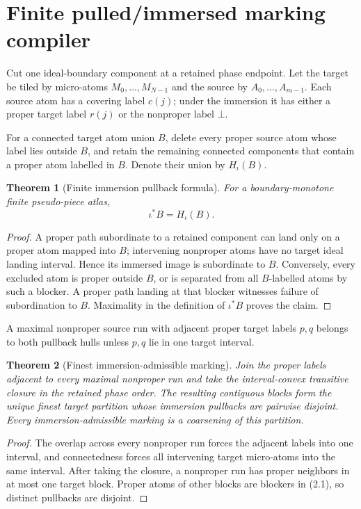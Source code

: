 \documentclass[11pt]{article}
\newtheorem{theorem}{Theorem}[section]
\theoremstyle{definition}
\theoremstyle{remark}
\begin{document}
\section{Finite pulled/immersed marking compiler}
Cut one ideal-boundary component at a retained phase endpoint.  Let the target
be tiled by micro-atoms $M_0,\ldots,M_{N-1}$ and the source by
$A_0,\ldots,A_{m-1}$.  Each source atom has a covering label $c(j)$; under the
immersion it has either a proper target label $r(j)$ or the nonproper label
$\bot$.

For a connected target atom union $B$, delete every proper source atom whose
label lies outside $B$, and retain the remaining connected components that
contain a proper atom labelled in $B$.  Denote their union by $H_\iota(B)$.

\begin{theorem}[Finite immersion pullback formula]
For a boundary-monotone finite pseudo-piece atlas,
\[
 \boxed{\iota^*B=H_\iota(B).}
 \tag{2.1}
\]
\end{theorem}

\begin{proof}
A proper path subordinate to a retained component can land only on a proper
atom mapped into $B$; intervening nonproper atoms have no target ideal landing
interval.  Hence its immersed image is subordinate to $B$.  Conversely, every
excluded atom is proper outside $B$, or is separated from all $B$-labelled
atoms by such a blocker.  A proper path landing at that blocker witnesses
failure of subordination to $B$.  Maximality in the definition of
$\iota^*B$ proves the claim.
\end{proof}

A maximal nonproper source run with adjacent proper target labels $p,q$ belongs
to both pullback hulls unless $p,q$ lie in one target interval.

\begin{theorem}[Finest immersion-admissible marking]
Join the proper labels adjacent to every maximal nonproper run and take the
interval-convex transitive closure in the retained phase order.  The resulting
contiguous blocks form the unique finest target partition whose immersion
pullbacks are pairwise disjoint.  Every immersion-admissible marking is a
coarsening of this partition.
\end{theorem}

\begin{proof}
The overlap across every nonproper run forces the adjacent labels into one
interval, and connectedness forces all intervening target micro-atoms into the
same interval.  After taking the closure, a nonproper run has proper neighbors
in at most one target block.  Proper atoms of other blocks are blockers in
(2.1), so distinct pullbacks are disjoint.
\end{proof}
\end{document}
